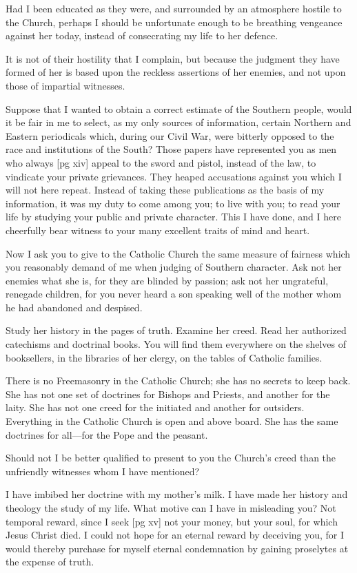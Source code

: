 Had I been educated as they were, and surrounded
by an atmosphere hostile to the Church,
perhaps I should be unfortunate enough to be
breathing vengeance against her today, instead of
consecrating my life to her defence.

It is not of their hostility that I complain, but
because the judgment they have formed of her is
based upon the reckless assertions of her enemies,
and not upon those of impartial witnesses.

Suppose that I wanted to obtain a correct estimate
of the Southern people, would it be fair in me
to select, as my only sources of information, certain
Northern and Eastern periodicals which,
during our Civil War, were bitterly opposed to
the race and institutions of the South? Those
papers have represented you as men who always
[pg xiv]
appeal to the sword and pistol, instead of the law,
to vindicate your private grievances. They heaped
accusations against you which I will not here repeat.
Instead of taking these publications as the
basis of my information, it was my duty to come
among you; to live with you; to read your life by
studying your public and private character. This
I have done, and I here cheerfully bear witness to
your many excellent traits of mind and heart.

Now I ask you to give to the Catholic Church
the same measure of fairness which you reasonably
demand of me when judging of Southern
character. Ask not her enemies what she is, for
they are blinded by passion; ask not her ungrateful,
renegade children, for you never heard a son
speaking well of the mother whom he had abandoned
and despised.

Study her history in the pages of truth. Examine
her creed. Read her authorized catechisms
and doctrinal books. You will find them everywhere
on the shelves of booksellers, in the libraries
of her clergy, on the tables of Catholic families.

There is no Freemasonry in the Catholic
Church; she has no secrets to keep back. She has
not one set of doctrines for Bishops and Priests,
and another for the laity. She has not one creed
for the initiated and another for outsiders. Everything
in the Catholic Church is open and above
board. She has the same doctrines for all—for
the Pope and the peasant.

Should not I be better qualified to present to you
the Church's creed than the unfriendly witnesses
whom I have mentioned?

I have imbibed her doctrine with my mother's
milk. I have made her history and theology the
study of my life. What motive can I have in misleading
you? Not temporal reward, since I seek
[pg xv]
not your money, but your soul, for which Jesus
Christ died. I could not hope for an eternal reward
by deceiving you, for I would thereby purchase
for myself eternal condemnation by gaining
proselytes at the expense of truth.

